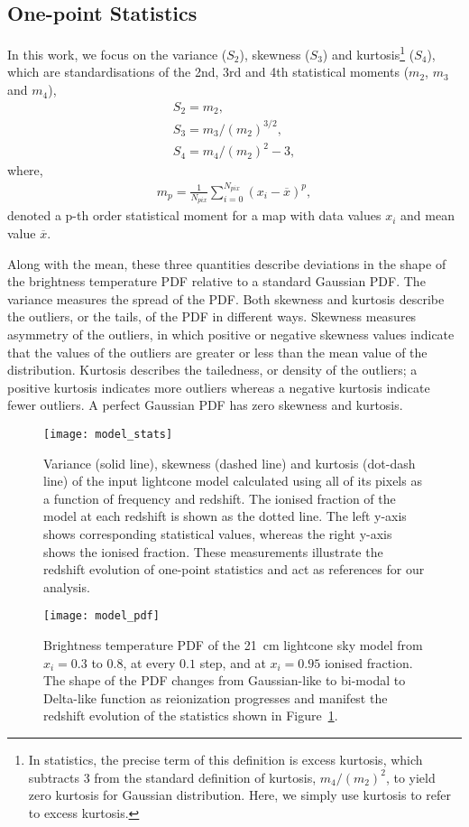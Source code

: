 \documentclass[fleqn,usenatbib]{mnras}
\begin{document}
\subsection{One-point Statistics}
\label{sec:ref_stats}
In this work, we focus on the variance ($S_2$), skewness ($S_3$) and kurtosis\footnote{In statistics, the precise term of this definition is excess kurtosis, which subtracts 3 from the standard definition of kurtosis, $m_4 / (m_2)^2$, to yield zero kurtosis for Gaussian distribution. Here, we simply use kurtosis to refer to excess kurtosis.} ($S_4$), which are standardisations of the 2nd, 3rd and 4th statistical moments ($m_2$, $m_3$ and $m_4$),
\begin{gather}
    S_2 = m_2, \\
    S_3 = m_3 / (m_2)^{3/2}, \\
    S_4 = m_4 / (m_2)^2 - 3,
\end{gather}
where, 
\begin{gather}
    m_p = \frac{1}{N_{pix}}\sum_{i=0}^{N_{pix}} (x_i - \overline{x})^p, \label{eq:moments}
\end{gather} denoted a p-th order statistical moment for a map with data values $x_i$ and mean value $\overline{x}$.

Along with the mean, these three quantities describe deviations in the shape of the brightness temperature PDF relative to a standard Gaussian PDF. The variance measures the spread of the PDF. Both skewness and kurtosis describe the outliers, or the tails, of the PDF in different ways. Skewness measures asymmetry of the outliers, in which positive or negative skewness values indicate that the values of the outliers are greater or less than the mean value of the distribution. Kurtosis describes the tailedness, or density of the outliers; a positive kurtosis indicates more outliers whereas a negative kurtosis indicate fewer outliers. A perfect Gaussian PDF has zero skewness and kurtosis.

\begin{figure}
    \texttt{[image: model\_stats]}
    \caption{Variance (solid line), skewness (dashed line) and kurtosis (dot-dash line) of the input lightcone model calculated using all of its pixels as a function of frequency and redshift.  The ionised fraction of the model at each redshift is shown as the dotted line. The left y-axis shows corresponding statistical values, whereas the right y-axis shows the ionised fraction. These measurements illustrate the redshift evolution of one-point statistics and act as references for our analysis.}
    \label{fig:model_stats}
\end{figure}
\begin{figure}
    \texttt{[image: model\_pdf]}
    \caption{Brightness temperature PDF of the 21~cm lightcone sky model from $x_i=0.3$ to $0.8$, at every $0.1$ step, and at $x_i=0.95$ ionised fraction. The shape of the PDF changes from Gaussian-like to bi-modal to Delta-like function as reionization progresses and manifest the redshift evolution of the statistics shown in Figure~\ref{fig:model_stats}.}
    \label{fig:model_pdf}
\end{figure}
\end{document}
